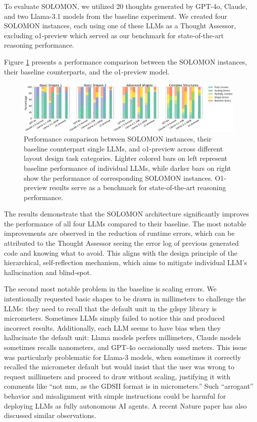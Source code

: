 \documentclass{article}
\begin{document}
To evaluate SOLOMON, we utilized 20 thoughts generated by GPT-4o, Claude, and two Llama-3.1 models from the baseline experiment. We created four SOLOMON instances, each using one of these LLMs as a Thought Assessor, excluding o1-preview which served as our benchmark for state-of-the-art reasoning performance.

Figure \ref{fig:performance_comparison} presents a performance comparison between the SOLOMON instances, their baseline counterparts, and the o1-preview model.

\begin{figure}[ht]
  \centering
  \includegraphics[width=\textwidth]{output.png}
  \caption{Performance comparison between SOLOMON instances, their baseline counterpart single LLMs, and o1-preview across different layout design task categories. Lighter colored bars on left represent baseline performance of individual LLMs, while darker bars on right show the performance of corresponding SOLOMON instances. O1-preview results serve as a benchmark for state-of-the-art reasoning performance.}
  \label{fig:performance_comparison}
\end{figure}

The results demonstrate that the SOLOMON architecture significantly improves the performance of all four LLMs compared to their baseline. The most notable improvements are observed in the reduction of runtime errors, which can be attributed to the Thought Assessor seeing the error log of previous generated code and knowing what to avoid. This aligns with the design principle of the hierarchical, self-reflection mechanism, which aims to mitigate individual LLM's hallucination and blind-spot.

The second most notable problem in the baseline is scaling errors. We intentionally requested basic shapes to be drawn in millimeters to challenge the LLMs: they need to recall that the default unit in the gdspy library is micrometers. Sometimes LLMs simply failed to notice this and produced incorrect results. Additionally, each LLM seems to have bias when they hallucinate the default unit: Llama models perfers millimeters, Claude models sometimes recalls nanometers, and GPT-4o occasionally used meters. This issue was particularly problematic for Llama-3 models, when sometimes it correctly recalled the micrometer default but would insist that the user was wrong to request millimeters and proceed to draw without scaling, justifying it with comments like ``not mm, as the GDSII format is in micrometers.'' Such ``arrogant'' behavior and misalignment with simple instructions could be harmful for deploying LLMs as fully autonomous AI agents. A recent Nature paper \cite{ZhouNature2024} has also discussed similar observations.
\end{document}

